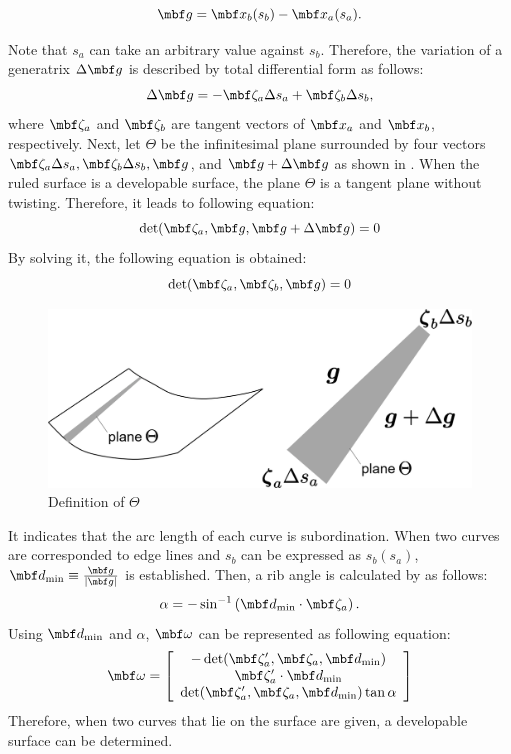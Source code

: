 \documentclass[E]{scitrans}
\begin{document}
\begin{equation}
\mbold{g} = \mbold{x}_b(s_b)-\mbold{x}_a(s_a).
\end{equation}

Note that $s_a$ can take an arbitrary value against $ s_b $. Therefore, the variation of a generatrix $ \Delta \mbold{g} $ is described by total differential form as follows:
\begin{equation}
\Delta \mbold{g} = -\zetavec_a \Delta s_a + \zetavec_b \Delta s_b,
\end{equation}
where $ \zetavec_a$ and $\zetavec_b $ are tangent vectors of $ \mbold{x}_a $ and $ \mbold{x}_b $, respectively. Next, let $ \Theta $ be the infinitesimal plane surrounded by four vectors $ \zetavec_a \Delta s_a, \zetavec_b \Delta s_b,\mbold{g}$, and $\mbold{g}+\Delta \mbold{g} $ as shown in . When the ruled surface is a developable surface, the plane $ \Theta $ is a tangent plane without twisting. Therefore, it leads to following equation:
\begin{equation}
\det (\zetavec_a, \mbold{g}, \mbold{g}+\Delta \mbold{g})=0
\end{equation}
By solving it, the following equation is obtained:
\begin{equation}
\det (\zetavec_a, \zetavec_b, \mbold{g})=0
\label{eq:Cond1}
\end{equation}
\begin{figure}[!h]
	\centering
	\includegraphics[width = 0.8\columnwidth]{./figure/Theta.eps}
	\caption{Definition of $ \Theta $}
	\label{fig:Theta}
\end{figure}
It indicates that the arc length of each curve is subordination. When two curves are corresponded to edge lines and $s_b$ can be expressed as $s_b(s_a)$, $\mbold{d}_{\min}\equiv\frac{\mbold{g}}{|\mbold{g}|}$ is established. Then, a rib angle is calculated by  as follows:
\begin{equation}
\alpha = -\sin^{-1}\left( \mbold{d}_{\min} \cdot \zetavec_a \right).
\end{equation}
Using $\mbold{d}_{\min}$ and $\alpha$, $\mbold{\omega}$ can be represented as following equation:
\begin{equation}\label{eq:omegaVec}
\mbold{\omega} = \left[\begin{array}{c} -\det(\zetavec_a',\zetavec_a, \mbold{d}_{\min} ) \\ \zetavec_a' \cdot \mbold{d}_{\min} \\ \det(\zetavec_a',\zetavec_a, \mbold{d}_{\min} ) \tan \alpha \end{array}\right] 
\end{equation}
Therefore, when two curves that lie on the surface are given, a developable surface can be determined.
\end{document}
